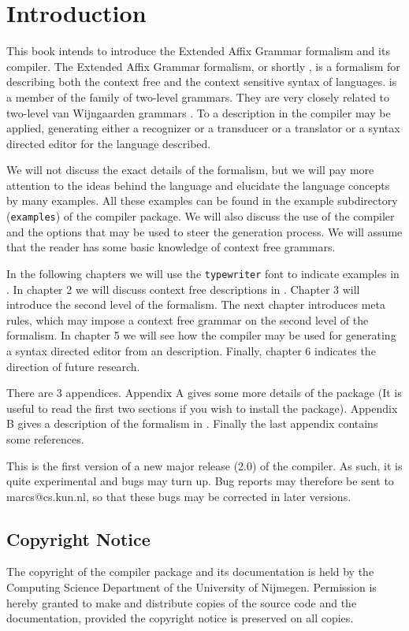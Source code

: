 \chapter {Introduction}
This book intends to introduce the Extended Affix Grammar
formalism \cite{watt} and its compiler. The Extended Affix Grammar
formalism, or shortly \EAGns, is a formalism for describing both
the context free and the context sensitive syntax of languages.
\EAG is a member of the family of two-level grammars. They are
very closely related to two-level van Wijngaarden grammars
\cite {revised report}. To a description in \EAG the \EAG compiler
may be applied, generating either a recognizer or a transducer or
a translator or a syntax directed editor for the language described.

We will not discuss the exact details of the formalism, but we will
pay more attention to the ideas behind the language and
elucidate the language concepts by many examples. All these
examples can be found in the example subdirectory ({\tt examples})
of the compiler package. We will also discuss the use of the
compiler and the options that may be used to steer the
generation process. We will assume that the reader has
some basic knowledge of context free grammars.

In the following chapters we will use the {\tt typewriter} font to
indicate examples in \EAGns. In chapter 2 we will
discuss context free descriptions in \EAGns. Chapter 3 will 
introduce the second level of the formalism.
The next chapter introduces meta rules, which may impose a context free
grammar on the second level of the formalism.
In chapter 5 we will see how the compiler may be used for
generating a syntax directed editor from an \EAG description.
Finally, chapter 6 indicates the direction of future research.

There are 3 appendices. Appendix A gives some more details
of the package (It is useful to read the first two sections if you
wish to install the package). Appendix B gives a description of the
\EAG formalism in \EAGns. Finally the last appendix contains some
references.

This is the first version of a new major release (2.0) of the
\EAG compiler. As such, it is quite experimental and bugs may
turn up. Bug reports may therefore be sent to marcs@cs.kun.nl,
so that these bugs may be corrected in later versions.
\section*{Copyright Notice}
The copyright of the \EAG compiler package and its documentation
is held by the Computing Science Department of the University of
Nijmegen. Permission is hereby granted to make and distribute copies
of the source code and the documentation, provided the copyright
notice is preserved on all copies.
